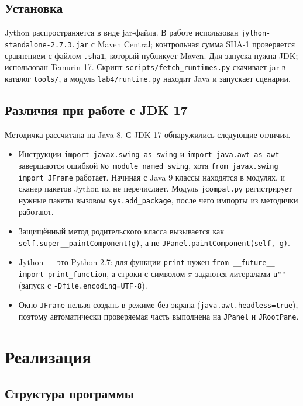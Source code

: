 \documentclass[14pt,a4paper]{extarticle}
\begin{document}
\subsection{Установка}

Jython распространяется в виде jar-файла. В работе использован
\texttt{jython-standalone-2.7.3.jar} с Maven Central; контрольная сумма SHA-1
проверяется сравнением с файлом \texttt{.sha1}, который публикует Maven. Для запуска
нужна JDK; использован Temurin 17. Скрипт \texttt{scripts/fetch\_runtimes.py} скачивает
jar в каталог \texttt{tools/}, а модуль \texttt{lab4/runtime.py} находит Java и запускает
сценарии.

\subsection{Различия при работе с JDK 17}

Методичка рассчитана на Java 8. С JDK 17 обнаружились следующие отличия.

\begin{itemize}
\item Инструкции \texttt{import javax.swing as swing} и \texttt{import java.awt as awt}
завершаются ошибкой \texttt{No module named swing}, хотя
\texttt{from javax.swing import JFrame} работает. Начиная с Java 9 классы находятся в
модулях, и сканер пакетов Jython их не перечисляет. Модуль \texttt{jcompat.py}
регистрирует нужные пакеты вызовом \texttt{sys.add\_package}, после чего импорты из
методички работают.
\item Защищённый метод родительского класса вызывается как
\texttt{self.super\_\_paintComponent(g)}, а не \texttt{JPanel.paintComponent(self, g)}.
\item Jython --- это Python 2.7: для функции \texttt{print} нужен
\texttt{from \_\_future\_\_ import print\_function}, а строки с символом $\pi$ задаются
литералами \texttt{u""} (запуск с \texttt{-Dfile.encoding=UTF-8}).
\item Окно \texttt{JFrame} нельзя создать в режиме без экрана
(\texttt{java.awt.headless=true}), поэтому автоматически проверяемая часть выполнена на
\texttt{JPanel} и \texttt{JRootPane}.
\end{itemize}

\section{Реализация}

\subsection{Структура программы}
\end{document}
